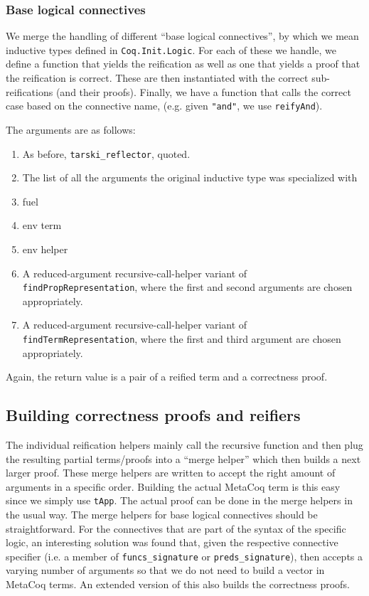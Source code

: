\documentclass[11pt,a4paper]{article}
\begin{document}
\subsubsection{Base logical connectives}
We merge the handling of different \enquote{base logical connectives}, by which we mean inductive types defined in \lstinline|Coq.Init.Logic|. For each of these we handle, we define a function that yields the reification as well as one that yields a proof that the reification is correct. These are then instantiated with the correct sub-reifications (and their proofs). Finally, we have a function that calls the correct case based on the connective name, (e.g. given \lstinline|"and"|, we use \lstinline|reifyAnd|).

The arguments are as follows:
\begin{enumerate}
	\item As before, \lstinline|tarski_reflector|, quoted.
	\item The list of all the arguments the original inductive type was specialized with
	\item fuel
	\item env term
	\item env helper
	\item A reduced-argument recursive-call-helper variant of \lstinline|findPropRepresentation|, where the first and second arguments are chosen appropriately.
	\item A reduced-argument recursive-call-helper variant of \lstinline|findTermRepresentation|, where the first and third argument are chosen appropriately.
\end{enumerate}
Again, the return value is a pair of a reified term and a correctness proof.
\subsection{Building correctness proofs and reifiers}
The individual reification helpers mainly call the recursive function and then plug the resulting partial terms/proofs into a \enquote{merge helper} which then builds a next larger proof. These merge helpers are written to accept the right amount of arguments in a specific order. Building the actual MetaCoq term is this easy since we simply use \lstinline|tApp|. The actual proof can be done in the merge helpers in the usual way. The merge helpers for base logical connectives should be straightforward. For the connectives that are part of the syntax of the specific logic, an interesting solution was found that, given the respective connective specifier (i.e. a member of \lstinline|funcs_signature| or \lstinline|preds_signature|), then accepts a varying number of arguments so that we do not need to build a vector in MetaCoq terms. An extended version of this also builds the correctness proofs.
\newpage
\end{document}
